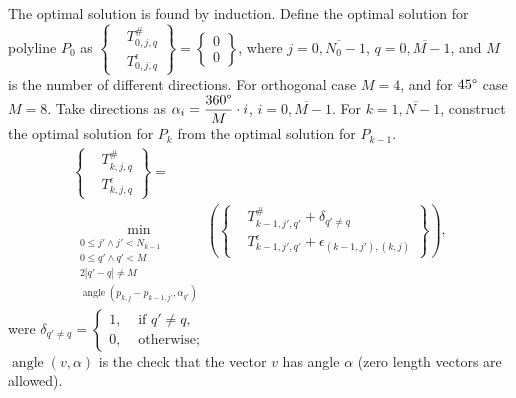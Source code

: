 \documentclass[conference]{IEEEtran}
\DeclareMathOperator{\functionangle}{angle}
\begin{document}
The optimal solution is found by induction. Define the optimal solution for polyline $P_0$ as
$
  \left\{
    \begin{aligned}
      & T_{0, j, q}^{\#}\\
      & T_{0, j, q}^{\epsilon}
    \end{aligned}
  \right\}
  =
  \left\{
    \begin{aligned}
      0\\
      0
    \end{aligned}
  \right\}
$,
where
$
  j = \overline{0, N_0 - 1}
$,
$
  q = \overline{0, M - 1}
$,
and
$M$ is the number of different directions. For orthogonal case $M = 4$, and for $45 \degree$ case $M = 8$. Take directions as $\alpha_{i} = \dfrac{360 \degree}{M} \cdot i$, $i = \overline{0, M - 1}$.
For $k = \overline{1, N - 1}$, construct the optimal solution for $P_k$ from the optimal solution for $P_{k - 1}$.
\begin{multline*}
    \left\{
      \begin{aligned}
        & T_{k, j, q}^{\#}\\
        & T_{k, j, q}^{\epsilon}
      \end{aligned}
    \right\}
    =
    \\
    \min
    _
    {
      \begin{aligned}
        0 \leq j' \wedge j' < N_{k - 1}\\
        0 \leq q' \wedge q' < M\\
        2 \left| q' - q \right| \neq M\\
        \functionangle{\left( p_{k, j} - p_{k - 1, j'}, \alpha_{q'} \right)}
      \end{aligned}
    }
    {
      \left(
        \left\{
          \begin{aligned}
            & T_{k - 1, j', q'}^{\#} + \delta_{q' \neq q}\\
            & T_{k - 1, j', q'}^{\epsilon}
            +
            \epsilon
            _
            {
              \left( k - 1, j' \right),
              \left( k, j \right)
            }
          \end{aligned}
        \right\}
      \right)
    }
    ,
\end{multline*}
were
$
  \delta_{q' \neq q}
  =
  \left\{
    \begin{aligned}
      1, & \text{ if } q' \neq q,\\
      0, & \text{ otherwise};
    \end{aligned}
  \right.
$
\\
$ \functionangle{ \left( v, \alpha \right)} $ is the check that the vector $v$ has angle $\alpha$ (zero length vectors are allowed).
\end{document}
